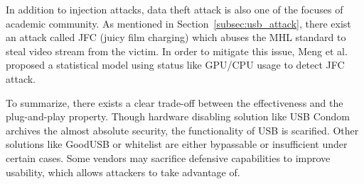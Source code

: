 In addition to injection attacks, data theft attack is also one of the focuses of academic community. As mentioned in Section~\ref{subsec:usb_attack}, there exist an attack called JFC (juicy film charging)\cite{JFC} which abuses the MHL standard to steal video stream from the victim. In order to mitigate this issue, Meng et al.\cite{meng2018252} proposed a statistical model using status like GPU/CPU usage to detect JFC attack.

To summarize, there exists a clear trade-off between the effectiveness and the plug-and-play property. Though hardware disabling solution like USB Condom archives the almost absolute security, the functionality of USB is scarified. Other solutions like GoodUSB or whitelist are either bypassable or insufficient under certain cases.
Some vendors may sacrifice defensive capabilities to improve usability, which allows attackers to take advantage of.

